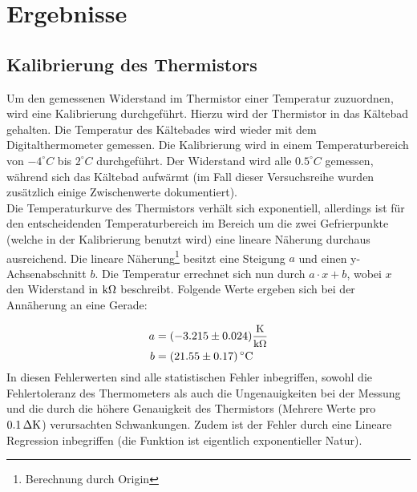 \section{Ergebnisse}

\subsection{Kalibrierung des Thermistors}
Um den gemessenen Widerstand im Thermistor einer Temperatur zuzuordnen, wird eine Kalibrierung durchgeführt. Hierzu wird der Thermistor in das Kältebad gehalten. Die Temperatur des Kältebades wird wieder mit dem Digitalthermometer gemessen. Die Kalibrierung wird in einem Temperaturbereich von $-4^\circ C$ bis $2^\circ C$ durchgeführt. Der Widerstand wird alle $0.5^\circ C$ gemessen, während sich das Kältebad aufwärmt (im Fall dieser Versuchsreihe wurden zusätzlich einige Zwischenwerte dokumentiert).\\
Die Temperaturkurve des Thermistors verhält sich exponentiell, allerdings ist für den entscheidenden Temperaturbereich im Bereich um die zwei Gefrierpunkte (welche in der Kalibrierung benutzt wird) eine lineare Näherung durchaus ausreichend. Die lineare Näherung\footnote{Berechnung durch Origin} besitzt eine Steigung $a$ und einen y-Achsenabschnitt $b$. Die Temperatur errechnet sich nun durch $a \cdot x + b$, wobei $x$ den Widerstand in $\unit[]{k\Omega}$ beschreibt. Folgende Werte ergeben sich bei der Annäherung an eine Gerade:

\begin{align*}
a &= (-3.215 \pm 0.024)\frac{\text{\fontsize{9}{1}\selectfont {K}}}{\text{\fontsize{9}{1}\selectfont {k$\Omega$}}}\\
b &= \unit[(21.55 \pm 0.17)]{^\circ C}
\end{align*}
%
In diesen Fehlerwerten sind alle statistischen Fehler inbegriffen, sowohl die Fehlertoleranz des Thermometers als auch die Ungenauigkeiten bei der Messung und die durch die höhere Genauigkeit des Thermistors (Mehrere Werte pro $\unit[0.1]{\Delta K}$) verursachten Schwankungen. Zudem ist der Fehler durch eine Lineare Regression inbegriffen (die Funktion ist eigentlich exponentieller Natur).


